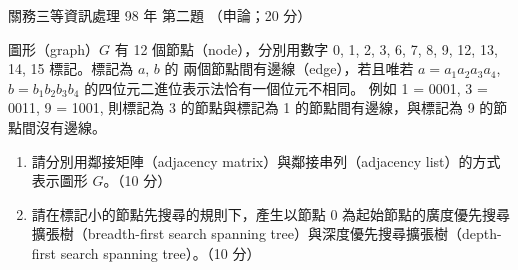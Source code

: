 \begin{pastexam}[label={px:gw3-098-ds-02}]{關務三等資訊處理 98 年 第二題}
（申論；20 分）

圖形（graph）$G$ 有 12 個節點（node），分別用數字 0, 1, 2, 3, 6, 7, 8, 9, 12, 13, 14, 15 標記。標記為 $a$, $b$ 的
兩個節點間有邊線（edge），若且唯若 $a = a_1a_2a_3a_4$, $b = b_1b_2b_3b_4$ 的四位元二進位表示法恰有一個位元不相同。
例如 1 = 0001, 3 = 0011, 9 = 1001, 則標記為 3 的節點與標記為 1 的節點間有邊線，與標記為 9 的節點間沒有邊線。
\begin{enumerate}[leftmargin=2.6em, labelsep=0.4em]
\item[㈠] 請分別用鄰接矩陣（adjacency matrix）與鄰接串列（adjacency list）的方式表示圖形 $G$。（10 分）
\item[㈡] 請在標記小的節點先搜尋的規則下，產生以節點 0 為起始節點的廣度優先搜尋擴張樹（breadth-first search
spanning tree）與深度優先搜尋擴張樹（depth-first search spanning tree）。（10 分）
\end{enumerate}
\end{pastexam}

